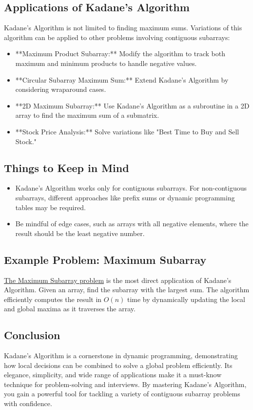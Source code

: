 \subsection*{Applications of Kadane's Algorithm}
Kadane's Algorithm is not limited to finding maximum sums. Variations of this algorithm can be applied to other problems involving contiguous subarrays:
\begin{itemize}
    \item **Maximum Product Subarray:** Modify the algorithm to track both maximum and minimum products to handle negative values.
    \item **Circular Subarray Maximum Sum:** Extend Kadane’s Algorithm by considering wraparound cases.
    \item **2D Maximum Subarray:** Use Kadane’s Algorithm as a subroutine in a 2D array to find the maximum sum of a submatrix.
    \item **Stock Price Analysis:** Solve variations like "Best Time to Buy and Sell Stock."
\end{itemize}

\subsection*{Things to Keep in Mind}
\begin{itemize}
    \item Kadane's Algorithm works only for contiguous subarrays. For non-contiguous subarrays, different approaches like prefix sums or dynamic programming tables may be required.
    \item Be mindful of edge cases, such as arrays with all negative elements, where the result should be the least negative number.
\end{itemize}

\subsection*{Example Problem: Maximum Subarray}
\hyperref[problem:Maximum_Subarray]{The Maximum Subarray problem} is the most direct application of Kadane's Algorithm. Given an array, find the subarray with the largest sum. The algorithm efficiently computes the result in \(O(n)\) time by dynamically updating the local and global maxima as it traverses the array.

\subsection*{Conclusion}
Kadane's Algorithm is a cornerstone in dynamic programming, demonstrating how local decisions can be combined to solve a global problem efficiently. Its elegance, simplicity, and wide range of applications make it a must-know technique for problem-solving and interviews. By mastering Kadane’s Algorithm, you gain a powerful tool for tackling a variety of contiguous subarray problems with confidence.